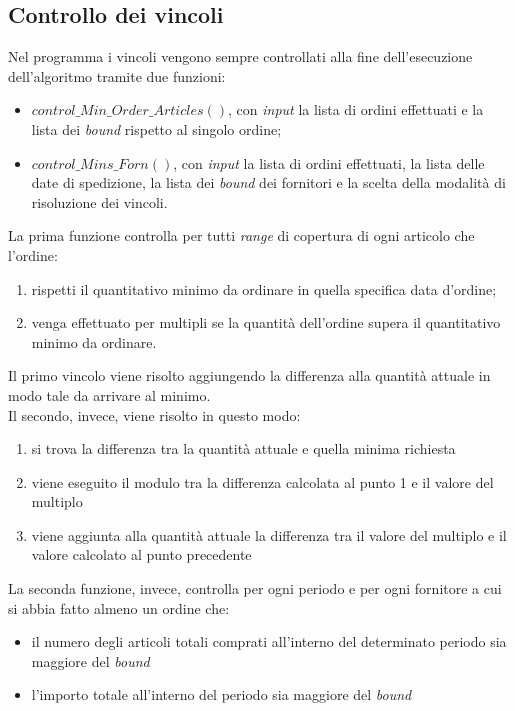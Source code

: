 \subsection{Controllo dei vincoli}
\label{sec:controllo-vincoli}
\noindent Nel programma i vincoli vengono sempre controllati alla fine dell'esecuzione dell'algoritmo
tramite due funzioni:
\begin{itemize}
    \item $control\_Min\_Order\_Articles()$, con \textit{input} la
    lista di ordini effettuati e la lista dei \textit{bound} rispetto
    al singolo ordine;
    \item $control\_Mins\_Forn()$, con \textit{input} la lista di
    ordini effettuati, la lista delle date di spedizione,
    la lista dei \textit{bound} dei fornitori e la scelta della
    modalità di risoluzione dei vincoli.
\end{itemize}
\newpage
\noindent La prima funzione controlla per tutti \textit{range} di
copertura di ogni articolo che l'ordine:
\begin{enumerate}
    \item rispetti il quantitativo minimo
    da ordinare in quella specifica data d'ordine;
    \item venga effettuato per multipli se la quantità
    dell'ordine supera il quantitativo minimo da ordinare.
\end{enumerate}
Il primo vincolo viene risolto aggiungendo la differenza alla quantità attuale
in modo tale da arrivare al minimo.\\
Il secondo, invece, viene risolto in questo modo:
\begin{enumerate}
    \item si trova la differenza tra la quantità attuale
    e quella minima richiesta
    \item viene eseguito il modulo tra la differenza calcolata al punto 1 e il valore del multiplo
    \item viene aggiunta alla quantità attuale la differenza tra il valore del multiplo e il valore calcolato al punto precedente 
\end{enumerate}
\vspace*{0.5cm}
\noindent La seconda funzione, invece, controlla per ogni 
periodo e per ogni fornitore a cui si abbia fatto
almeno un ordine che:
\begin{itemize}
    \item il numero degli articoli totali comprati all'interno
    del determinato periodo sia maggiore del \textit{bound}
    \item l'importo totale all'interno del periodo sia
    maggiore del \textit{bound}
\end{itemize}
